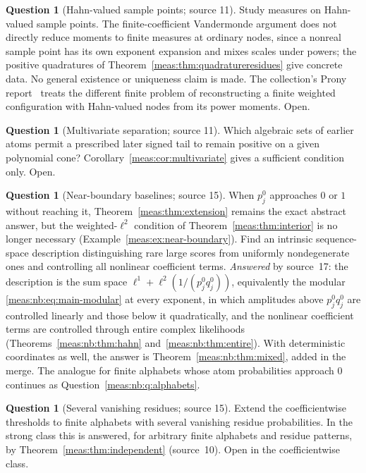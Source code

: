 \documentclass[11pt]{article}
\numberwithin{equation}{section}
\theoremstyle{definition}
\newtheorem{question}[theorem]{Question}
\theoremstyle{remark}
\begin{document}
\begin{question}[Hahn-valued sample points; source 11]\label{meas:q:hahnpoints}
Study measures on Hahn-valued sample points. The finite-coefficient Vandermonde
argument does not directly reduce moments to finite measures at ordinary nodes,
since a nonreal sample point has its own exponent expansion and mixes scales under
powers; the positive quadratures of Theorem~\ref{meas:thm:quadratureresidues} give
concrete data. No general existence or uniqueness claim is made. The collection's
Prony report~\cite{repoprony} treats the different finite problem of reconstructing
a finite weighted configuration with Hahn-valued nodes from its power moments. Open.
\end{question}

\begin{question}[Multivariate separation; source 11]\label{meas:q:multivariate}
Which algebraic sets of earlier atoms permit a prescribed later signed tail to remain
positive on a given polynomial cone? Corollary~\ref{meas:cor:multivariate} gives a
sufficient condition only. Open.
\end{question}

\begin{question}[Near-boundary baselines; source 15]\label{meas:q:nearboundary}
When $p_j^0$ approaches $0$ or $1$ without reaching it, Theorem~\ref{meas:thm:extension}
remains the exact abstract answer, but the weighted-$\ell^2$ condition of
Theorem~\ref{meas:thm:interior} is no longer necessary
(Example~\ref{meas:ex:near-boundary}). Find an intrinsic sequence-space description
distinguishing rare large scores from uniformly nondegenerate ones and controlling
all nonlinear coefficient terms. \emph{Answered} by source~17: the description is
the sum space $\ell^1+\ell^2(1/(p_j^0q_j^0))$, equivalently the modular
\eqref{meas:nb:eq:main-modular} at every exponent, in which amplitudes above
$p_j^0q_j^0$ are controlled linearly and those below it quadratically, and the
nonlinear coefficient terms are controlled through entire complex likelihoods
(Theorems~\ref{meas:nb:thm:hahn} and~\ref{meas:nb:thm:entire}). With deterministic
coordinates as well, the answer is Theorem~\ref{meas:nb:thm:mixed}, added in the
merge. The analogue for finite alphabets whose atom probabilities approach $0$
continues as Question~\ref{meas:nb:q:alphabets}.
\end{question}

\begin{question}[Several vanishing residues; source 15]\label{meas:q:residues}
Extend the coefficientwise thresholds to finite alphabets with several vanishing
residue probabilities. In the strong class this is answered, for arbitrary finite
alphabets and residue patterns, by Theorem~\ref{meas:thm:independent} (source~10).
Open in the coefficientwise class.
\end{question}
\end{document}
